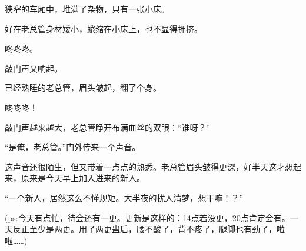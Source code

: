 \begin{this_body}
狭窄的车厢中，堆满了杂物，只有一张小床。

好在老总管身材矮小，蜷缩在小床上，也不显得拥挤。

咚咚咚。

敲门声又响起。

已经熟睡的老总管，眉头皱起，翻了个身。

咚咚咚！

敲门声越来越大，老总管睁开布满血丝的双眼：“谁呀？”

“是俺，老总管。”门外传来一个声音。

这声音还很陌生，但又带着一点点的熟悉。老总管眉头皱得更深，好半天这才想起来，原来是今天早上加入进来的新人。

“一个新人，居然这么不懂规矩。大半夜的扰人清梦，想干嘛！？”

(ps:今天有点忙，待会还有一更。更新是这样的：14点若没更，20点肯定会有。一天反正至少是两更。用了两更蛊后，腰不酸了，背不疼了，腿脚也有劲了，啦啦……)

\end{this_body}

